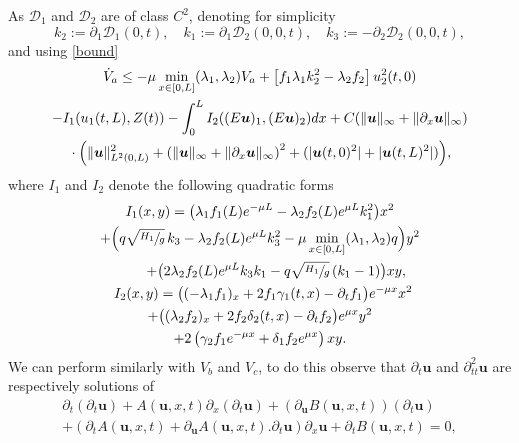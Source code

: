 As $\mathcal{D}_{1}$ and $\mathcal{D}_{2}$ are of class $C^{2}$,
denoting for simplicity
\[
k_{2}:=\partial_{1} \mathcal{D}_{1}(0,t),\quad k_{1}:=\partial_{1}\mathcal{D}_{2}(0,0,t),\quad
k_{3}:=-\partial_{2}\mathcal{D}_{2}(0,0,t),
\]
and using \eqref{bound}
\begin{multline*}
\dot V_{a}\leq
-\mu\min\limits_{x\in[0,L]}(\lambda_{1},\lambda_{2})V_{a}+\left[f_{1}\lambda_{1}k_{2}^{2}-\lambda_{2}f_{2}\right]u_{2}^{2}(t,0)\\
-I_{1}(u_{1}(t,L),Z(t))
-\int_{0}^{L}I_{2}((E\boldsymbol{u})_{1},(E\boldsymbol{u})_{2})dx+C(\lVert \boldsymbol{u}\rVert_{\infty}+\lVert \partial_{x} \boldsymbol{u}\rVert_{\infty})\\{}\cdot\Bigl(\lVert\boldsymbol{u} \rVert_{L^{2}(0,L)}^{2}+\left(\lVert \boldsymbol{u}\rVert_{\infty}+\lVert \partial_{x} \boldsymbol{u}\rVert_{\infty}\right)^{2}+(|\boldsymbol{u}(t,0)^{2}|+|\boldsymbol{u}(t,L)^{2}|)\Bigr),
\end{multline*}
where $I_{1}$ and $I_{2}$ denote the following quadratic forms
\begin{multline*}
I_{1}(x,y)=\bigl(\lambda_{1}f_{1}(L)e^{-\mu L}-\lambda_{2}f_{2}(L)e^{\mu L}k_{1}^{2}\bigr)x^{2}\\
+{\Bigl(q\sqrt{\sfrac{H_{1}}{g}}\,k_{3}-\lambda_{2}f_{2}(L)e^{\mu L}k_{3}^{2}-\mu\min\limits_{x\in[0,L]}(\lambda_{1},\lambda_{2})q\Bigr)}y^{2}\\
\shoveright{+\bigl(2\lambda_{2}f_{2}(L)e^{\mu L}k_{3}k_{1}-{q\sqrt{\sfrac{H_{1}}{g}}}\,(k_{1}-1)\bigr)xy,}\\
\shoveleft{I_{2}(x,y)=\bigl((-\lambda_{1}f_{1})_{x}+2f_{1}\gamma_{1}(t,x)-\partial_{t}f_{1}\bigr)e^{-\mu x}x^{2}}\\
+\bigl((\lambda_{2}f_{2})_{x}+2f_{2}\delta_{2}(t,x)-\partial_{t}f_{2}\bigr)e^{\mu x}y^{2}\\
+2\left(\gamma_{2}f_{1}e^{-\mu x}+\delta_{1}f_{2}e^{\mu x}\right)xy.
\end{multline*}
We can perform similarly with $V_{b}$ and $V_{c}$, to do this observe that $\partial_{t}\boldsymbol{u}$ and $\partial_{tt}^{2}\boldsymbol{u}$ are respectively solutions of
\begin{multline}
\label{V2}
\partial_{t}(\partial_{t}\boldsymbol{u})+A(\boldsymbol{u},x,t)\partial_{x}(\partial_{t}\boldsymbol{u})+(\partial_{\boldsymbol{u}}B(\boldsymbol{u},x,t))(\partial_{t}\boldsymbol{u})
\\
+(\partial_{t}A(\boldsymbol{u},x,t)+\partial_{\boldsymbol{u}}A(\boldsymbol{u},x,t).\partial_{t}\boldsymbol{u})\partial_{x}\boldsymbol{u}
+\partial_{t}B\left(\boldsymbol{u},x,t\right)=0,
\end{multline}
